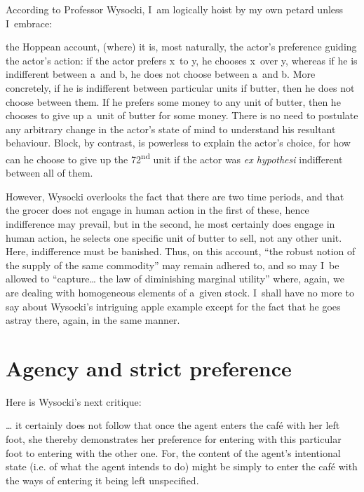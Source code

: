 According to Professor Wysocki, I~am logically hoist by my own petard unless I~embrace:



the Hoppean account, (where) it is, most naturally, the actor's preference guiding the actor's action: if the actor prefers x~to y, he chooses x~over y, whereas if he is indifferent between a~and b, he does not choose between a~and b. More concretely, if he is indifferent between particular units if butter, then he does not choose between them. If he prefers some money to any unit of butter, then he chooses to give up a~unit of butter for some money. There is no need to postulate any arbitrary change in the actor's state of mind to understand his resultant behaviour. Block, by contrast, is powerless to explain the actor's choice, for how can he choose to give up the 72\textsuperscript{nd} unit if the actor was \textit{ex hypothesi} indifferent between all of them.



However, Wysocki overlooks the fact that there are two time periods, and that the grocer does not engage in human action in the first of these, hence indifference may prevail, but in the second, he most certainly does engage in human action, he selects one specific unit of butter to sell, not any other unit. Here, indifference must be banished. Thus, on this account, ``the robust notion of the supply of the same commodity'' may remain adhered to, and so may I~be allowed to ``capture… the law of diminishing marginal utility'' where, again, we are dealing with homogeneous elements of a~given stock. I~shall have no more to say about Wysocki's intriguing apple example except for the fact that he goes astray there, again, in the same manner.



\section{Agency and strict preference}

Here is Wysocki's next critique:



… it certainly does not follow that once the agent enters the café with her left foot, she thereby demonstrates her preference for entering with this particular foot to entering with the other one. For, the content of the agent's intentional state (i.e. of what the agent intends to do) might be simply to enter the café with the ways of entering it being left unspecified.




